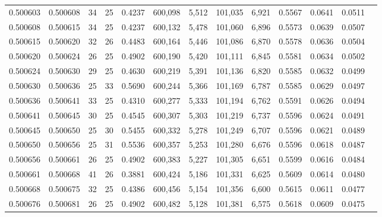\begin{tabular}{rrrrrrrrrrrrr}
0.500603 & 0.500608 &    34 &  25 &                                     0.4237 & 600,098 &   5,512 & 101,035 &   6,921 & 0.5567 & 0.0641 & 0.0511 \\
0.500608 & 0.500615 &    34 &  25 &                                     0.4237 & 600,132 &   5,478 & 101,060 &   6,896 & 0.5573 & 0.0639 & 0.0507 \\
0.500615 & 0.500620 &    32 &  26 &                                     0.4483 & 600,164 &   5,446 & 101,086 &   6,870 & 0.5578 & 0.0636 & 0.0504 \\
0.500620 & 0.500624 &    26 &  25 &                                     0.4902 & 600,190 &   5,420 & 101,111 &   6,845 & 0.5581 & 0.0634 & 0.0502 \\
0.500624 & 0.500630 &    29 &  25 &                                     0.4630 & 600,219 &   5,391 & 101,136 &   6,820 & 0.5585 & 0.0632 & 0.0499 \\
0.500630 & 0.500636 &    25 &  33 &                                     0.5690 & 600,244 &   5,366 & 101,169 &   6,787 & 0.5585 & 0.0629 & 0.0497 \\
0.500636 & 0.500641 &    33 &  25 &                                     0.4310 & 600,277 &   5,333 & 101,194 &   6,762 & 0.5591 & 0.0626 & 0.0494 \\
0.500641 & 0.500645 &    30 &  25 &                                     0.4545 & 600,307 &   5,303 & 101,219 &   6,737 & 0.5596 & 0.0624 & 0.0491 \\
0.500645 & 0.500650 &    25 &  30 &                                     0.5455 & 600,332 &   5,278 & 101,249 &   6,707 & 0.5596 & 0.0621 & 0.0489 \\
0.500650 & 0.500656 &    25 &  31 &                                     0.5536 & 600,357 &   5,253 & 101,280 &   6,676 & 0.5596 & 0.0618 & 0.0487 \\
0.500656 & 0.500661 &    26 &  25 &                                     0.4902 & 600,383 &   5,227 & 101,305 &   6,651 & 0.5599 & 0.0616 & 0.0484 \\
0.500661 & 0.500668 &    41 &  26 &                                     0.3881 & 600,424 &   5,186 & 101,331 &   6,625 & 0.5609 & 0.0614 & 0.0480 \\
0.500668 & 0.500675 &    32 &  25 &                                     0.4386 & 600,456 &   5,154 & 101,356 &   6,600 & 0.5615 & 0.0611 & 0.0477 \\
0.500676 & 0.500681 &    26 &  25 &                                     0.4902 & 600,482 &   5,128 & 101,381 &   6,575 & 0.5618 & 0.0609 & 0.0475 \\

\end{tabular}

